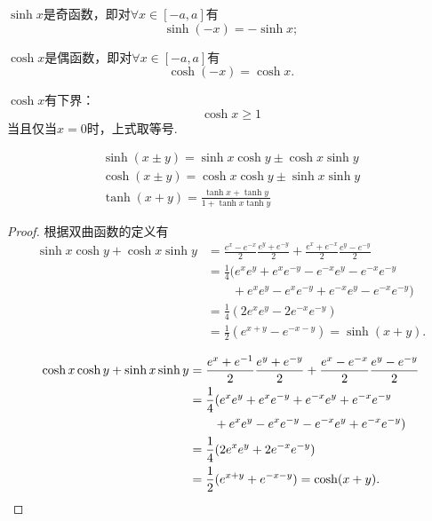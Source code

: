 \begin{property}
\(\sinh x\)是奇函数，即对\(\forall x \in [-a,a]\)有\[
\sinh(-x) = -\sinh x;
\]

\(\cosh x\)是偶函数，即对\(\forall x \in [-a,a]\)有\[
\cosh(-x) = \cosh x.
\]
\end{property}

\begin{property}
\(\cosh{x}\)有下界：\[
\cosh{x} \geq 1
\]当且仅当\(x=0\)时，上式取等号.
\end{property}

\begin{theorem}
\begin{gather}
\sinh(x \pm y) = \sinh{x}\cosh{y} \pm \cosh{x}\sinh{y} \\
\cosh(x \pm y) = \cosh{x}\cosh{y} \pm \sinh{x}\sinh{y} \\
\tanh(x + y) = \frac{\tanh{x} + \tanh{y}}{1 + \tanh{x}\tanh{y}}
\end{gather}
\begin{proof}
根据双曲函数的定义有
\begin{align*}
\sinh{x}\cosh{y}+\cosh{x}\sinh{y}
&= \frac{e^x - e^{-x}}{2} \frac{e^y + e^{-y}}{2} + \frac{e^x + e^{-x}}{2} \frac{e^y - e^{-y}}{2} \\
&= \frac{1}{4} (e^x e^y + e^x e^{-y} - e^{-x} e^y - e^{-x} e^{-y} \\
&\qquad+ e^x e^y - e^x e^{-y} + e^{-x} e^y - e^{-x} e^{-y}) \\
&= \frac{1}{4} (2 e^x e^y - 2 e^{-x} e^{-y}) \\
&= \frac{1}{2} (e^{x+y} - e^{-x-y}) = \sinh(x+y).
\end{align*}

\begin{align*}
\cosh{x}\cosh{y}+\sinh{x}\sinh{y}
&= \frac{e^x + e^{-1}}{2} \frac{e^y + e^{-y}}{2} + \frac{e^x - e^{-x}}{2} \frac{e^y - e^{-y}}{2} \\
&= \frac{1}{4} (e^x e^y + e^x e^{-y} + e^{-x} e^y + e^{-x} e^{-y} \\
&\qquad+ e^x e^y - e^x e^{-y} - e^{-x} e^y + e^{-x} e^{-y}) \\
&= \frac{1}{4} (2 e^x e^y + 2 e^{-x} e^{-y}) \\
&= \frac{1}{2} (e^{x+y} + e^{-x-y}) = \cosh(x+y).
\qedhere
\end{align*}
\end{proof}
\end{theorem}

